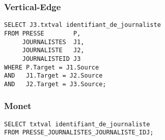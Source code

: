 \subsubsection{Vertical-Edge}
\begin{verbatim}
SELECT J3.txtval identifiant_de_journaliste
FROM PRESSE        P,
     JOURNALISTES  J1,
     JOURNALISTE   J2,
     JOURNALISTEID J3
WHERE P.Target = J1.Source
AND   J1.Target = J2.Source
AND   J2.Target = J3.Source;
\end{verbatim}

\subsubsection{Monet}
\begin{verbatim}
SELECT txtval identifiant_de_journaliste
FROM PRESSE_JOURNALISTES_JOURNALISTE_IDJ;
\end{verbatim}
